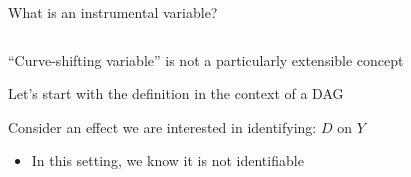 \documentclass[notes,11pt, aspectratio=169]{beamer}
\newenvironment{wideitemize}{\itemize\addtolength{\itemsep}{10pt}}{\enditemize}
\begin{document}
\begin{frame}{What is an instrumental variable?}
  \begin{columns}[T] %
    \begin{column}{0.6\textwidth}
  \begin{wideitemize}
  \item ``Curve-shifting variable'' is not a particularly extensible concept
  \item Let's start with the definition in the context of a DAG
  \item Consider an effect we are interested in identifying: $D$ on $Y$
    \begin{itemize}
    \item In this setting, we know it is not identifiable
    \end{itemize}
  \end{wideitemize}
\end{column}
\begin{column}{0.4\textwidth}
  \begin{center}
      \end{center}
\end{column}
\end{columns}
\end{frame}
\end{document}
